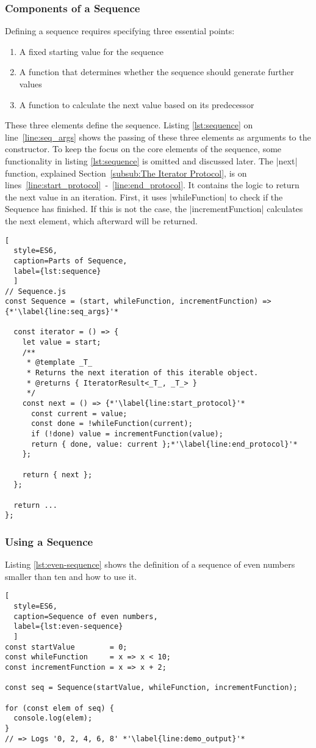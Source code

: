 \subsubsection{Components of a Sequence}
\label{subsub:Components of a Sequence}
Defining a sequence requires specifying three essential points:
\begin{enumerate}
  \item{A fixed starting value for the sequence} 
  \item{A function that determines whether the sequence should generate
    further values} 
  \item{A function to calculate the next value based on its predecessor} 
\end{enumerate}
These three elements define the sequence. Listing \ref{lst:sequence} on
line~\ref{line:seq_args} shows the passing of these three elements as arguments
to the constructor. To keep the focus on the core elements of the sequence,
some functionality in listing \ref{lst:sequence} is omitted and discussed later.
The |next| function, explained Section~\ref{subsub:The Iterator Protocol}, is on
lines~\ref{line:start_protocol}~-~\ref{line:end_protocol}. It contains the
logic to return the next value in an iteration. First, it uses |whileFunction|
to check if the Sequence has finished. If this is not the case, the
|incrementFunction| calculates the next element, which afterward will be
returned.

\begin{lstlisting}[
  style=ES6, 
  caption=Parts of Sequence,
  label={lst:sequence}
  ]
// Sequence.js
const Sequence = (start, whileFunction, incrementFunction) => {*'\label{line:seq_args}'*

  const iterator = () => {
    let value = start;
    /**
     * @template _T_
     * Returns the next iteration of this iterable object.
     * @returns { IteratorResult<_T_, _T_> }
     */
    const next = () => {*'\label{line:start_protocol}'*
      const current = value;
      const done = !whileFunction(current);
      if (!done) value = incrementFunction(value);
      return { done, value: current };*'\label{line:end_protocol}'*
    };

    return { next };
  };

  return ... 
};
\end{lstlisting}


\subsubsection{Using a Sequence}
\label{subsub:Using a Sequence}
Listing \ref{lst:even-sequence} shows the definition of a sequence of even 
numbers smaller than ten and how to use it. 
\begin{lstlisting}[
  style=ES6, 
  caption=Sequence of even numbers,
  label={lst:even-sequence}
  ]
const startValue        = 0;
const whileFunction     = x => x < 10;
const incrementFunction = x => x + 2;

const seq = Sequence(startValue, whileFunction, incrementFunction);

for (const elem of seq) {
  console.log(elem);
}
// => Logs '0, 2, 4, 6, 8' *'\label{line:demo_output}'*
\end{lstlisting}


